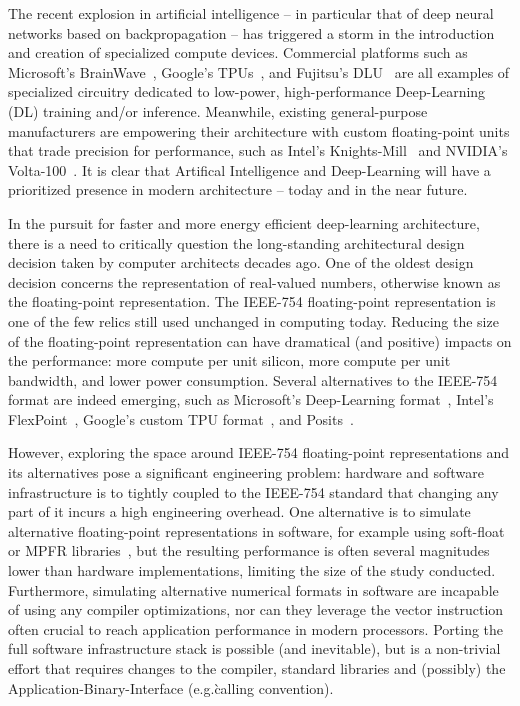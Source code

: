 \documentclass[techrep,english]{ipsj} %
\begin{document}
The recent explosion in artificial intelligence – in particular that of deep neural networks based on backpropagation – has triggered a storm in the introduction and creation of specialized compute devices.
Commercial platforms such as Microsoft’s BrainWave~\cite{msbrainwave}, Google’s TPUs~\cite{googletpu}, and Fujitsu’s DLU~\cite{fujitsudlu} are all examples of specialized circuitry dedicated to low-power, high-performance Deep-Learning (DL) training and/or inference.
Meanwhile, existing general-purpose manufacturers are empowering their architecture with custom floating-point units that trade precision for performance, such as Intel’s Knights-Mill~\cite{knm} and NVIDIA’s Volta-100~\cite{volta100}.
It is clear that Artifical Intelligence and Deep-Learning will have a prioritized presence in modern architecture -- today and in the near future.

In the pursuit for faster and more energy efficient deep-learning architecture, there is a need to critically question the long-standing architectural design decision taken by computer architects decades ago.
One of the oldest design decision concerns the representation of real-valued numbers, otherwise known as the floating-point representation.
The IEEE-754 floating-point representation is one of the few relics still used unchanged in computing today.
Reducing the size of the floating-point representation can have dramatical (and positive) impacts on the performance: more compute per unit silicon, more compute per unit bandwidth, and lower power consumption.
Several alternatives to the IEEE-754 format are indeed emerging, such as Microsoft’s Deep-Learning format~\cite{msbrainwave}, Intel’s FlexPoint~\cite{intelflexpoint}, Google’s custom TPU format~\cite{tpuformat}, and Posits~\cite{posits}.

However, exploring the space around IEEE-754 floating-point representations and its alternatives pose a significant engineering problem: hardware and software infrastructure is to tightly coupled to the IEEE-754 standard that changing any part of it incurs a high engineering overhead.
One alternative is to simulate alternative floating-point representations in software, for example using soft-float or MPFR libraries~\cite{softfloat}, but the resulting performance is often several magnitudes lower than hardware implementations, limiting the size of the study conducted.
Furthermore, simulating alternative numerical formats in software are incapable of using any compiler optimizations, nor can they leverage the vector instruction often crucial to reach application performance in modern processors.
Porting the full software infrastructure stack is possible (and inevitable), but is a non-trivial effort that requires changes to the compiler, standard libraries and (possibly) the Application-Binary-Interface (e.g.\`calling convention).
\end{document}
